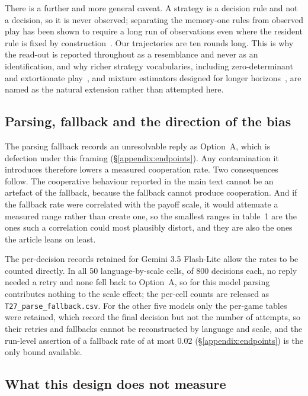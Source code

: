\documentclass[11pt,a4paper]{article}
\newcommand{\rev}[1]{{\color{red}#1}}
\newcommand{\rev}[1]{#1}
\begin{document}
There is a further and more general caveat. A strategy is a decision rule and not a decision, so it is never observed; separating the memory-one rules from observed play has been shown to require a long run of observations even where the resident rule is fixed by construction~\cite{kim2021win,hilbe2013memory}. Our trajectories are ten rounds long. This is why the read-out is reported throughout as a resemblance and never as an identification, and why richer strategy vocabularies, including zero-determinant and extortionate play~\cite{pressDyson2012}, and mixture estimators designed for longer horizons~\cite{fontana2025nicer,inferenceStrategies}, are named as the natural extension rather than attempted here.

\subsection{Parsing, fallback and the direction of the bias}\label{appendix:robust_parsing}

The parsing fallback records an unresolvable reply as Option~A, which is defection under this framing (\S\ref{appendix:endpoints}). Any contamination it introduces therefore lowers a measured cooperation rate. Two consequences follow. The cooperative behaviour reported in the main text cannot be an artefact of the fallback, because the fallback cannot produce cooperation. And if the fallback rate were correlated with the payoff scale, it would attenuate a measured range rather than create one, so the smallest ranges in table~1 are the ones such a correlation could most plausibly distort, and they are also the ones the article leans on least.

\rev{The per-decision records retained for Gemini 3.5 Flash-Lite allow the rates to be counted directly. In all 50 language-by-scale cells, of 800 decisions each, no reply needed a retry and none fell back to Option~A, so for this model parsing contributes nothing to the scale effect; the per-cell counts are released as \texttt{T27\_parse\_fallback.csv}. For the other five models only the per-game tables were retained, which record the final decision but not the number of attempts, so their retries and fallbacks cannot be reconstructed by language and scale, and the run-level assertion of a fallback rate of at most 0.02 (\S\ref{appendix:endpoints}) is the only bound available.}

\subsection{What this design does not measure}\label{appendix:robust_gaps}
\end{document}
